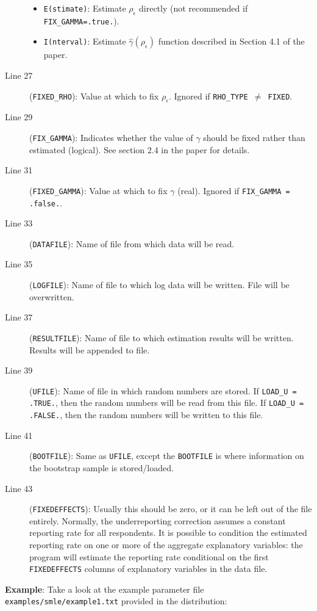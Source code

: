 \documentclass{article}
\begin{document}
\begin{description}
\begin{itemize}
		\item {\tt E(stimate)}: Estimate $\rho_{\epsilon}$ directly (not recommended if {\tt FIX\_GAMMA=.true.}).
		\item {\tt I(nterval)}: Estimate $\hat{\gamma}(\rho_{\epsilon})$ function described in Section 4.1 of
			the paper.
	\end{itemize}
\item[Line 27] ({\tt FIXED\_RHO}): Value at which to fix $\rho_{\epsilon}$.  Ignored if {\tt RHO\_TYPE $\neq$ FIXED}.
\item[Line 29] ({\tt FIX\_GAMMA}): Indicates whether the value of $\gamma$ should be fixed rather than estimated (logical).
	See section 2.4 in the paper for details.
\item[Line 31] ({\tt FIXED\_GAMMA}): Value at which to fix $\gamma$ (real).  Ignored if {\tt FIX\_GAMMA = .false.}.
\item[Line 33] ({\tt DATAFILE}): Name of file from which data will be read.
\item[Line 35] ({\tt LOGFILE}): Name of file to which log data will be written.
	File will be overwritten.
\item[Line 37] ({\tt RESULTFILE}): Name of file to which estimation results will be written.  Results
	will be appended to file.
\item[Line 39] ({\tt UFILE}): Name of file in which random numbers are stored.  
	If {\tt LOAD\_U = .TRUE.}, then the random numbers will be read from this file.  If 
	{\tt LOAD\_U = .FALSE.}, then the random numbers will be written to this file.
\item[Line 41] ({\tt BOOTFILE}): Same as {\tt UFILE}, except the {\tt BOOTFILE} is where information on the bootstrap sample is stored/loaded.
\item[Line 43] ({\tt FIXEDEFFECTS}): Usually this should be zero, or it can be left out of the file entirely.
	Normally, the underreporting correction assumes a constant reporting rate for all respondents.
	It is possible to condition the estimated reporting rate on one or more of the aggregate
	explanatory variables: the program will estimate the reporting rate conditional
	on the first {\tt FIXEDEFFECTS} columns of explanatory variables in the data file.
\end{description}

\vspace{0.5in}
{\bf Example}: Take a look at the example parameter file 
{\tt examples/smle/example1.txt} provided in the 
distribution:
\end{document}
